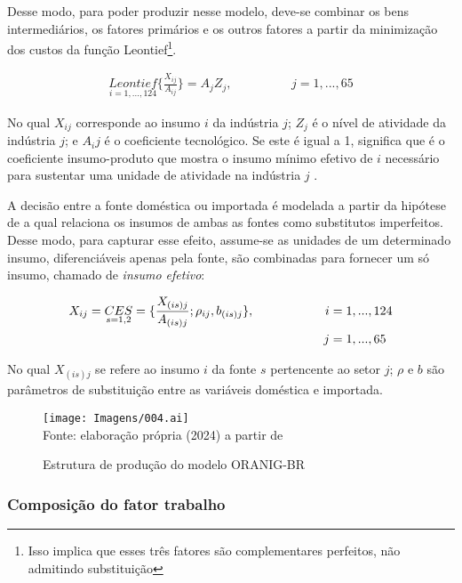 Desse modo, para poder produzir nesse modelo, deve-se combinar os bens intermediários, os fatores primários e os outros fatores a partir da minimização dos custos da função Leontief\footnote{Isso implica que esses três fatores são complementares perfeitos, não admitindo substituição}.

\begin{align}
	\underset{i = 1, ... , 124}{Leontief} \{\frac{X_{ij}}{A_{ij}}\} = A_jZ_j, \hspace{2cm} j = 1, ... , 65
\end{align}

No qual $X_{ij}$ corresponde ao insumo $i$ da indústria $j$; $Z_j$ é o nível de atividade da indústria $j$; e $A_ij$ é o coeficiente tecnológico. Se este é igual a 1, significa que é o coeficiente insumo-produto que mostra o insumo mínimo efetivo de $i$ necessário para sustentar uma unidade de atividade na indústria $j$ \cite{dixit80}.

A decisão entre a fonte doméstica ou importada é modelada a partir da hipótese de \textcite{armington69} a qual relaciona os insumos de ambas as fontes como substitutos imperfeitos. Desse modo, para capturar esse efeito, assume-se as unidades de um determinado insumo, diferenciáveis apenas pela fonte, são combinadas para fornecer um só insumo, chamado de \textit{insumo efetivo}:

\begin{align}
	X_{ij} = \underset{s = 1, 2}{CES} = \{\frac{X_{(is)j}}{A_{(is)j}}; \rho_{ij}, b_{(is)j}\}, \hspace{2cm} i & = 1, ... , 124 \\ j & = 1, ... , 65 \notag
\end{align}

No qual $X_{(is)j}$ se refere ao insumo $i$ da fonte $s$ pertencente ao setor $j$; $\rho$ e $b$ são parâmetros de substituição entre as variáveis doméstica e importada. 

\begin{landscape}
	\begin{figure}
		\centering
		\caption{Estrutura de produção do modelo ORANIG-BR} \label{fig:estrutura_producao}
		\texttt{[image: Imagens/004.ai]}
		\footnotesize \\
		Fonte: elaboração própria (2024) a partir de \textcite{horridge00}
	\end{figure}
\end{landscape}

\subsubsection{Composição do fator trabalho} \label{}

